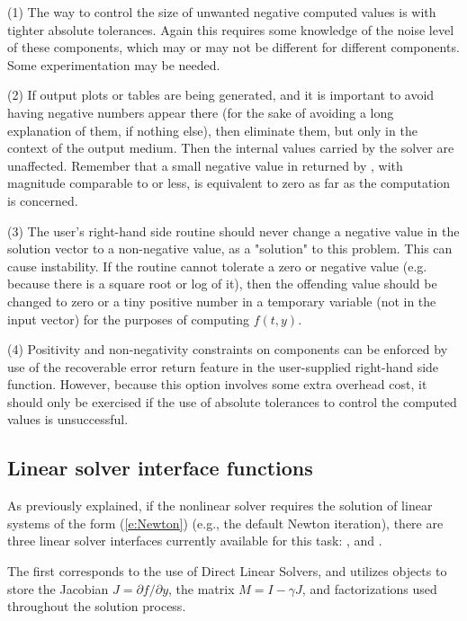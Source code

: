(1) The way to control the size of unwanted negative computed values
is with tighter absolute tolerances.  Again this requires some
knowledge of the noise level of these components, which may or may not
be different for different components.  Some experimentation may be
needed.

(2) If output plots or tables are being generated, and it is important
to avoid having negative numbers appear there (for the sake of avoiding
a long explanation of them, if nothing else), then eliminate them, but
only in the context of the output medium.  Then the internal values carried
by the solver are unaffected.  Remember that a small negative value in 
returned by {\cvode}, with magnitude comparable to  or less,
is equivalent to zero as far as the computation is concerned.

(3) The user's right-hand side routine  should never change a
negative value in the solution vector  to a non-negative value,
as a "solution" to this problem.  This can cause instability.  If the
 routine cannot tolerate a zero or negative value (e.g. because
there is a square root or log of it), then the offending value should
be changed to zero or a tiny positive number in a temporary variable
(not in the input  vector) for the purposes of computing $f(t,y)$.

(4) Positivity and non-negativity constraints on components can be
enforced by use of the recoverable error return feature in the
user-supplied right-hand side function.  However, because this option
involves some extra overhead cost, it should only be exercised if the
use of absolute tolerances to control the computed values is
unsuccessful.

\subsection{Linear solver interface functions}\label{sss:lin_solv_init}

As previously explained, if the nonlinear solver requires the solution of
linear systems of the form (\ref{e:Newton}) (e.g., the default Newton
iteration), there are three {\cvode} linear solver interfaces currently
available for this task: {\cvdls}, {\cvdiag} and {\cvspils}.

The first corresponds to the use of Direct Linear Solvers, and
utilizes {\sunmatrix} objects to store the Jacobian
$J = \partial{f}/\partial{y}$, the matrix $M = I-\gamma J$, and
factorizations used throughout the solution process.

